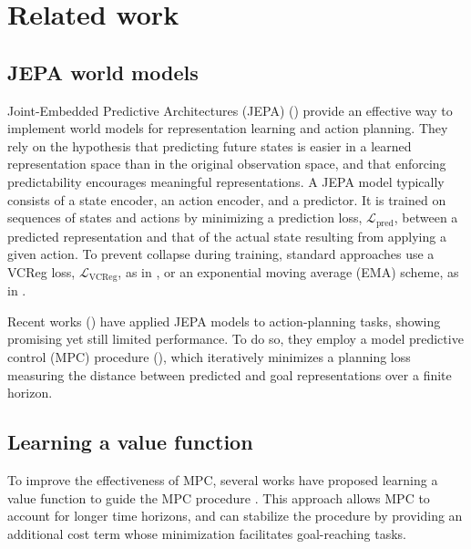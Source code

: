 \section{Related work}
\subsection{JEPA world models}
 Joint-Embedded Predictive Architectures (JEPA) (\cite{LeCun2022APT}) provide an effective way to implement world models for representation learning and action planning. They rely on the hypothesis that predicting future states is easier in a learned representation space than in the original observation space, and that enforcing predictability encourages meaningful representations. A JEPA model typically consists of a state encoder, an action encoder, and a predictor. It is trained on sequences of states and actions by minimizing a prediction loss, $\mathcal{L}_\text{pred}$, between a predicted representation and that of the actual state resulting from applying a given action. To prevent collapse during training, standard approaches use a VCReg loss, $\mathcal{L}_\text{VCReg}$, as in \cite{sobal2025learningrewardfreeofflinedata}, or an exponential moving average (EMA) scheme, as in \cite{assran2023selfsupervisedlearningimagesjointembedding, bardes2024revisitingfeaturepredictionlearning}.
 
Recent works (\cite{sobal2025learningrewardfreeofflinedata, zhou2025dinowmworldmodelspretrained}) have applied JEPA models to action-planning tasks, showing promising yet still limited performance. To do so, they employ a model predictive control (MPC) procedure (\cite{GARCIA1989335}), which iteratively minimizes a planning loss measuring the distance between predicted and goal representations over a finite horizon. 



\subsection{Learning a value function}

To improve the effectiveness of MPC, several works have proposed learning a value function to guide the MPC procedure \cite{farshidian2019deepvaluemodelpredictive, jordana2025infinitehorizonvaluefunctionapproximation}. This approach allows MPC to account for longer time horizons, and can stabilize the procedure by providing an additional cost term whose minimization facilitates goal-reaching tasks.

